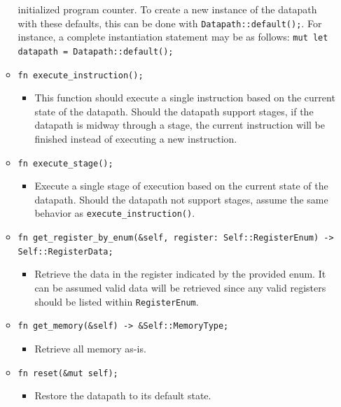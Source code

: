 \documentclass[
    paper=letter,
    parskip=half,
    fontsize=12pt,
    titlepage=firstiscover,
    toc=bibliography,
    numbers=endperiod
]{scrartcl}
\providecommand{\tightlist}{%
  \setlength{\itemsep}{0pt}\setlength{\parskip}{0pt}}
\begin{document}
\begin{itemize}
\begin{itemize}
                    initialized program counter. To create a new instance of the datapath
                    with these defaults, this can be done with
                    \texttt{Datapath::default();}. For instance, a complete instantiation
                    statement may be as follows: \texttt{mut let datapath =
                        Datapath::default();}
              \item \texttt{fn execute\_instruction();}
                    \begin{itemize}
                        \tightlist
                        \item This function should execute a single instruction based on the current
                              state of the datapath. Should the datapath support stages, if the
                              datapath is midway through a stage, the current instruction will be
                              finished instead of executing a new instruction.
                    \end{itemize}
              \item \texttt{fn execute\_stage();}
                    \begin{itemize}
                        \tightlist
                        \item Execute a single stage of execution based on the current state of the
                              datapath. Should the datapath not support stages, assume the same
                              behavior as \texttt{execute\_instruction()}.
                    \end{itemize}
              \item \texttt{fn get\_register\_by\_enum(\&self, register: Self::RegisterEnum) -\textgreater{} Self::RegisterData;}
                    \begin{itemize}
                        \tightlist
                        \item Retrieve the data in the register indicated by the provided enum. It can
                              be assumed valid data will be retrieved since any valid registers should
                              be listed within \texttt{RegisterEnum}.
                    \end{itemize}
              \item \texttt{fn get\_memory(\&self) -\textgreater{} \&Self::MemoryType;}
                    \begin{itemize}
                        \tightlist
                        \item Retrieve all memory as-is.
                    \end{itemize}
              \item \texttt{fn reset(\&mut self);}
                    \begin{itemize}
                        \tightlist
                        \item Restore the datapath to its default state.
                    \end{itemize}
          \end{itemize}


\end{itemize}
\end{document}
